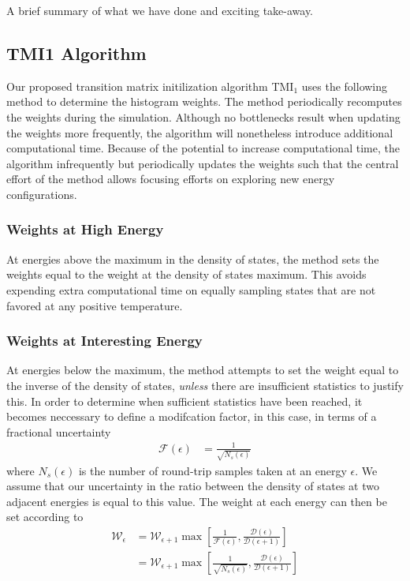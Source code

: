 \documentclass[letterpaper,twocolumn,amsmath,amssymb,pre,aps,10pt]{revtex4-1}
\begin{document}
A brief summary of what we have done and exciting take-away.


\subsection{TMI1 Algorithm}

Our proposed transition matrix initilization algorithm TMI$_1$ uses the following 
method to determine the histogram weights.  The method periodically recomputes 
the weights during the simulation.  Although no bottlenecks result when updating 
the weights more frequently, the algorithm will nonetheless introduce additional 
computational time.  Because of the potential to increase computational time, the 
algorithm infrequently but periodically updates the weights such that the central
effort of the method allows focusing efforts on exploring new energy
configurations.

\subsubsection{Weights at High Energy}
At energies above the maximum in the density of states, the method sets the weights 
equal to the weight at the density of states maximum.  This avoids expending 
extra computational time on equally sampling states that are not favored at any 
positive temperature.

\subsubsection{Weights at Interesting Energy}
At energies below the maximum, the method attempts to set the weight equal to the 
inverse of the density of states, \emph{unless} there are insufficient statistics 
to justify this.  In order to determine when sufficient statistics have been reached,
it becomes neccessary to define a modifcation factor, in this case, in terms of a 
fractional uncertainty
\begin{align}
  \mathcal{F}(\epsilon) &= \frac{1}{\sqrt{N_s(\epsilon)}}
\end{align}
where $N_s(\epsilon)$ is the number of round-trip samples taken at an energy
$\epsilon$.  We assume that our uncertainty in the ratio between the density
of states at two adjacent energies is equal to this value.  The weight at each
energy can then be set according to
\begin{align}
  \mathcal{W}_{\epsilon} &= \mathcal{W}_{\epsilon+1}\max\left[\frac1{\mathcal{F}
  (\epsilon)},\frac{\mathcal{D}(\epsilon)}{\mathcal{D}(\epsilon+1)}\right]
  \\
   &= \mathcal{W}_{\epsilon+1}\max\left[\frac1{\sqrt{N_s(\epsilon)}},
  \frac{\mathcal{D}(\epsilon)}{\mathcal{D}(\epsilon+1)}\right]
\end{align}
\end{document}
